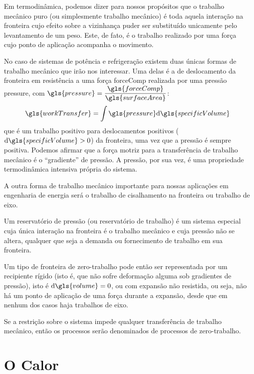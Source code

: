     Em termodinâmica, podemos dizer para nossos propósitos que o trabalho
    mecânico puro (ou simplesmente trabalho mecânico) é toda aquela interação
    na fronteira cujo efeito sobre a vizinhança puder ser substituído
    unicamente pelo levantamento de um peso. Este, de fato, é o trabalho
    realizado por uma força cujo ponto de aplicação acompanha o movimento.

    No caso de sistemas de potência e refrigeração existem duas únicas formas
    de trabalho mecânico que irão nos interessar. Uma delas é a de deslocamento
    da fronteira  em resistência a uma força \gls{forceComp}
    realizada por uma pressão \gls{pressure}, com $\gls{pressure} =
    \dfrac{\gls{forceComp}}{\gls{surfaceArea}}$:
    \begin{equation} \label{eq:0.2}
        \gls{workTransfer}
        =
        \int{
            \gls{pressure}
        }\diff{\gls{specificVolume}}
    \end{equation}
    que é um trabalho positivo para deslocamentos positivos
    ($\diff{\gls{specificVolume}} > 0$) da fronteira, uma vez que a pressão é
    sempre positiva. Podemos afirmar que a força motriz para a transferência de
    trabalho mecânico é o \enquote{gradiente} de pressão. A pressão, por sua
    vez, é uma propriedade termodinâmica intensiva própria do sistema.

    A outra forma de trabalho mecânico importante para nossas aplicações em
    engenharia de energia será o trabalho de cisalhamento na fronteira ou
    trabalho de eixo.

    Um reservatório de pressão (ou reservatório de trabalho) é um sistema
    especial cuja única interação na fronteira é o trabalho mecânico e cuja
    pressão não se altera, qualquer que seja a demanda ou fornecimento de
    trabalho em sua fronteira.

    Um tipo de fronteira de zero-trabalho pode então ser representada por um
    recipiente rígido (isto é, que não sofre deformação alguma sob gradientes
    de pressão), isto é $\diff{\gls{volume}} = 0$, ou com expansão não
    resistida, ou seja, não há um ponto de aplicação de uma força durante a
    expansão, desde que em nenhum dos casos haja trabalhos de eixo.

    Se a restrição sobre o sistema impede qualquer transferência de trabalho
    mecânico, então os processos serão denominados de processos de
    zero-trabalho.


    \section{O Calor}


